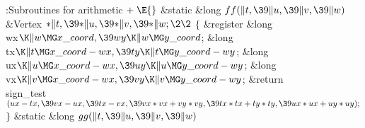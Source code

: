 \B{}:Subroutines for arithmetic\X${}\mathrel+\E{}$\6
\1\1\&{static} \&{long} ${}\\{ff}(\|t,\39\|u,\39\|v,\39\|w){}$\6
\&{Vertex} ${}{*}\|t,\39{*}\|u,\39{*}\|v,\39{*}\|w;\2\2{}$\6
${}\{{}$\5
\1\&{register} \&{long} \\{wx}${}\K\|w\MG\\{x\_coord},\39\\{wy}\K\|w\MG\\{y%
\_coord}{}$;\6
\&{long} \\{tx}${}\K\|t\MG\\{x\_coord}-\\{wx},\39\\{ty}\K\|t\MG\\{y\_coord}-%
\\{wy}{}$;\6
\&{long} \\{ux}${}\K\|u\MG\\{x\_coord}-\\{wx},\39\\{uy}\K\|u\MG\\{y\_coord}-%
\\{wy}{}$;\6
\&{long} \\{vx}${}\K\|v\MG\\{x\_coord}-\\{wx},\39\\{vy}\K\|v\MG\\{y\_coord}-%
\\{wy}{}$;\7
\&{return} \\{sign\_test}${}(\\{ux}-\\{tx},\39\\{vx}-\\{ux},\39\\{tx}-\\{vx},%
\39\\{vx}*\\{vx}+\\{vy}*\\{vy},\39\\{tx}*\\{tx}+\\{ty}*\\{ty},\39\\{ux}*\\{ux}+%
\\{uy}*\\{uy});{}$\6
\4${}\}{}$\2\7
\1\1\&{static} \&{long} ${}\\{gg}(\|t,\39\|u,\39\|v,\39\|w){}$\6

